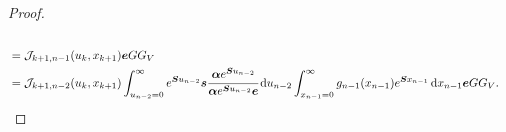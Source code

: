 \begin{proof}
\begin{align}
		\\& = \mathcal J_{k+1,n-1}(u_k,x_{k+1})  \bs e G  G_V\label{eqn: mid ref} 
		\\& = \mathcal J_{k+1,n-2}(u_k,x_{k+1}) \int_{u_{n-2}=0}^\infty e^{\bs{S}u_{n-2}}\bs s \cfrac{\bs \alpha e^{\bs{S}u_{n-2}}}{\bs \alpha e^{\bs{S}u_{n-2}}\bs e}\wrt u_{n-2}  \int_{x_{n-1}=0}^\infty g_{n-1}(x_{n-1}) e^{\bs{S}x_{n-1}} \wrt x_{n-1} \bs e G  G_V.\label{eqn: this}

\end{align}
\end{proof}

